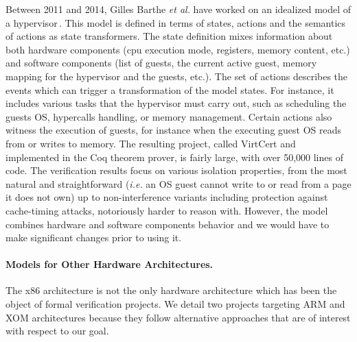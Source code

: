 Between 2011 and 2014, Gilles Barthe \emph{et al.} have worked on an idealized
model of a
hypervisor\,\cite{barthe2011virtcert1,barthe2012virtcert2,barthe2014virtcert3}.
%
This model is defined in terms of states, actions and the semantics of actions
as state trans\-formers.
%
The state definition mixes information about both hardware components (\ac{cpu}
execution mode, registers, memory content, etc.) and software components (list
of guests, the current active guest, memory mapping for the hypervisor and the
guests, etc.).
%
The set of actions describes the events which can trigger a transformation of
the model states.
%
For instance, it includes various tasks that the hypervisor must carry out, such
as scheduling the guests OS, hypercalls handling, or memory management.
%
Certain actions also witness the execution of guests, for instance when the executing guest OS reads from or writes to memory.
%
The resulting project, called VirtCert and implemented in the Coq theorem
prover, is fairly large, with over 50,000 lines of code.
%
The verification results focus on various isolation properties, from the most
natural and straightforward (\emph{i.e.} an OS guest cannot write to or read
from a page it does not own) up to non-interference variants including
protection against cache-timing attacks, notoriously harder to reason with.
%
However, the model combines hardware and software components behavior and we
would have to make significant changes prior to using it. 

\paragraph{Models for Other Hardware Architectures.}
%
The x86 architecture is not the only hardware architecture which has been the
object of formal verification projects.
%
We detail two projects targeting ARM and XOM architectures because
they follow alternative approaches that are of interest with respect to our
goal.

